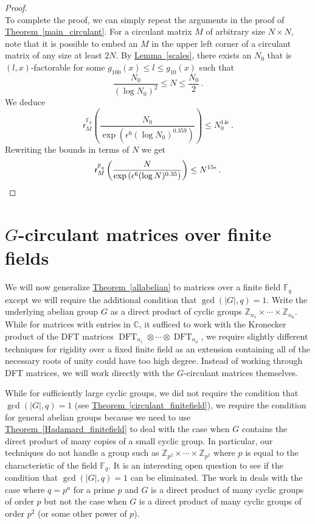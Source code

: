 \documentclass[11pt]{article}
\numberwithin{equation}{section}
\theoremstyle{definition}
\theoremstyle{plain}
\newcommand{\C}{\mathbb C}
\newcommand{\Z}{\mathbb Z}
\newcommand{\expref}[2]{\hyperref[#2]{#1~\ref{#2}}}
\theoremstyle{definition}
\newcommand\F{{\mathbb{F}}}
\renewcommand\Z{{\mathbb{Z}}}
\renewcommand\C{{\mathbb{C}}}
\DeclareMathOperator{\DFT}{DFT}
\begin{document}
\begin{proof}
\[\]
To complete the proof, we can simply repeat the arguments in the proof of \expref{Theorem}{main_circulant}.  For a circulant matrix $M$ of arbitrary size $N \times N$, note that it is possible to embed an $M$ in the upper left corner of a circulant matrix of any size at least $2N$.  By \expref{Lemma}{scales}, there exists an $N_0$ that is $(l,x)$-factorable for some $g_{100}(x) \leq l \leq g_{10}(x)$ such that
\[
\frac{N_0}{(\log N_0)^2} \leq N \leq \frac{N_0}{2} \,.
\]
We deduce
\[
\textsf{r}_{M}^{\F_q}\left(\frac{N_0}{\exp\left(\epsilon^6(\log N_0)^{0.359}\right)}\right) \leq N_0^{14 \epsilon} \,.
\]
Rewriting the bounds in terms of $N$ we get
\[
\textsf{r}_{M}^{\F_q}\left(\frac{N}{\exp\left(\epsilon^6(\log N)^{0.35}\right)}\right) \leq N^{15 \epsilon} \,. \qedhere
\]
\end{proof}


%
\section{\texorpdfstring{$G$}{G}-circulant matrices over finite fields} %
\label{sec_groupalgebra_finitefield}
We will now generalize \expref{Theorem}{allabelian} to matrices over a finite field $\F_q$ except we will require the additional condition that $\gcd(|G|,q) = 1$.  Write the underlying abelian group $G$ as a direct product of cyclic groups $\Z_{n_1} \times \cdots \times \Z_{n_a}$.  While for matrices with entries in $\C$, it sufficed to work with the Kronecker product of the DFT 
matrices $\DFT_{n_1} \otimes \cdots \otimes \DFT_{n_a}$, 
%
we require slightly different techniques for rigidity over a fixed finite field as an extension containing all of the necessary roots of unity could have too high degree.  Instead of working through DFT 
matrices, we will work directly with the $G$-circulant matrices themselves.  

While for sufficiently large cyclic groups, we did not require the condition that $\gcd(|G|,q) = 1$ (see \expref{Theorem}{circulant_finitefield}), we require the condition for general abelian groups because we need to use 
%
\expref{Theorem}{Hadamard_finitefield} to deal with the case when $G$ contains the direct product of many copies of a small cyclic group.  In particular, our techniques do not handle a group such as $\Z_{p^2} \times \cdots \times \Z_{p^2}$ where $p$ is equal to the characteristic of the field $\F_q$.  It is an interesting open question to see if the condition that $\gcd(|G|,q) = 1$ can be eliminated.  The work in \cite{CLP} deals with the case where $q = p^a$ for a prime $p$ and $G$ is a direct product of many cyclic groups of order $p$ but not the case when $G$ is a direct product of many cyclic groups of order $p^2$ (or some other power of $p$).
\end{document}
